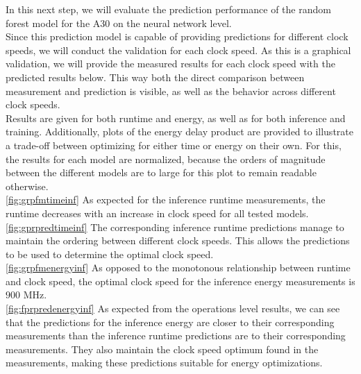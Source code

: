 In this next step, we will evaluate the prediction performance of the random forest model for the A30 on the neural network level. \\
Since this prediction model is capable of providing predictions for different clock speeds, we will conduct the validation for each clock speed. As this is a graphical validation, we will provide the measured results for each clock speed with the predicted results below. This way both the direct comparison between measurement and prediction is visible, as well as the behavior across different clock speeds. \\
Results are given for both runtime and energy, as well as for both inference and training. Additionally, plots of the energy delay product are provided to illustrate a trade-off between optimizing for either time or energy on their own. For this, the results for each model are normalized, because the orders of magnitude between the different models are to large for this plot to remain readable otherwise. \\
\ref{fig:grpfmtimeinf} As expected for the inference runtime measurements, the runtime decreases with an increase in clock speed for all tested models. \\
\ref{fig:gprpredtimeinf} The corresponding inference runtime predictions manage to maintain the ordering between different clock speeds.
This allows the predictions to be used to determine the optimal clock speed. \\
\ref{fig:grpfmenergyinf} As opposed to the monotonous relationship between runtime and clock speed, the optimal clock speed for the inference energy measurements is $900$ MHz. \\
\ref{fig:fprpredenergyinf} As expected from the operations level results, we can see that the predictions for the inference energy are closer to their corresponding measurements than the inference runtime predictions are to their corresponding measurements. They also maintain the clock speed optimum found in the measurements, making these predictions suitable for energy optimizations. \\
